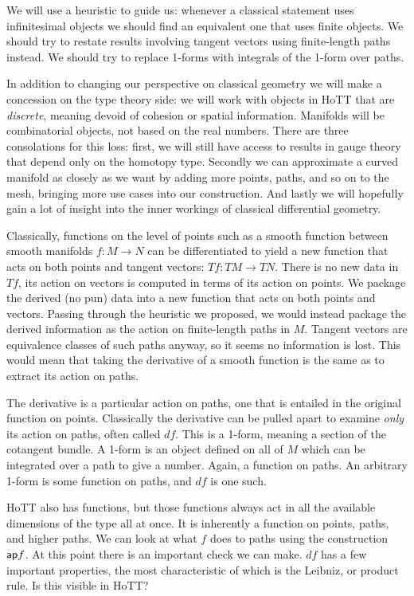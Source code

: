 \documentclass[12pt]{article}
\begin{document}
We will use a heuristic to guide us: whenever a classical statement uses infinitesimal objects we should find an equivalent one that uses finite objects. We should try to restate results involving tangent vectors using finite-length paths instead. We should try to replace 1-forms with integrals of the 1-form over paths.

In addition to changing our perspective on classical geometry we will make a concession on the type theory side: we will work with objects in HoTT that are \emph{discrete}, meaning devoid of cohesion or spatial information. Manifolds will be combinatorial objects, not based on the real numbers. There are three consolations for this loss: first, we will still have access to results in gauge theory that depend only on the homotopy type. Secondly we can approximate a curved manifold as closely as we want by adding more points, paths, and so on to the mesh, bringing more use cases into our construction. And lastly we will hopefully gain a lot of insight into the inner workings of classical differential geometry.

Classically, functions on the level of points such as a smooth function between smooth manifolds \( f:M\to N \) can be differentiated to yield a new function that acts on both points and tangent vectors: \( Tf:TM\to TN \). There is no new data in \( Tf \), its action on vectors is computed in terms of its action on points. We package the derived (no pun) data into a new function that acts on both points and vectors. Passing through the heuristic we proposed, we would instead package the derived information as the action on finite-length paths in \( M \). Tangent vectors are equivalence classes of such paths anyway, so it seems no information is lost. This would mean that taking the derivative of a smooth function is the same as to extract its action on paths.

The derivative is a particular action on paths, one that is entailed in the original function on points. Classically the derivative can be pulled apart to examine \emph{only} its action on paths, often called \( df \). This is a 1-form, meaning a section of the cotangent bundle. A 1-form is an object defined on all of \( M \) which can be integrated over a path to give a number. Again, a function on paths. An arbitrary 1-form is some function on paths, and \( df \) is one such.

HoTT also has functions, but those functions always act in all the available dimensions of the type all at once. It is inherently a function on points, paths, and higher paths. We can look at what \( f \) does to paths using the construction \( \textsf{ap} f \). At this point there is an important check we can make. \( df \) has a few important properties, the most characteristic of which is the Leibniz, or product rule. Is this visible in HoTT?
\end{document}
